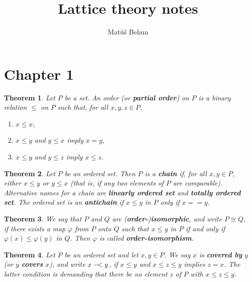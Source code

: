 \documentclass[a4paper,12pt,oneside]{report}%
\author{Mat\'u\v{s} Behun}
\title{Lattice theory notes}
\newcommand{\coveringA}{%
  \mathrel{-\mkern-4mu}<%
}
\newtheorem{theorem}{Theorem}
\begin{document}
\section{Chapter 1}

\begin{theorem}
Let $P$ be a set. An order (or \textbf{partial order}) on $P$ is a binary
    relation $\leq$ on $P$ such that, for all $x, y, z \in P$,
\begin{enumerate}
    \item $x \leq x$,
    \item $x \leq y$ and $y \leq x$ imply $x = y$,
    \item $x \leq y$ and $y \leq z$ imply $x \leq z$.
\end{enumerate}
\end{theorem}

\begin{theorem}
Let $P$ be an ordered set. Then $P$ is a \textbf{chain} if, for all
    $x, y \in P$, either $x \leq y$ or $y \leq x$ (that is, if any two elements
    of $P$ are comparable).
    Alternative names for a chain are \textbf{linearly ordered set} and
    \textbf{totally ordered set}.
The ordered set is an \textbf{antichain} if $x \leq y$ in $P$ only if $x ==y$.
\end{theorem}

\begin{theorem}
We say that $P$ and $Q$ are (\textbf{order-})\textbf{isomorphic}, and write
    $P \cong Q$, if there exists a map $\varphi$ from $P$ onto $Q$ such that
    $x \leq y$ in $P$ if and only if $\varphi(x) \leq \varphi(y)$ in $Q$. 
Then $\varphi$ is called \textbf{order-isomorphism}.
\end{theorem}

\begin{theorem}
Let $P$ be an ordered set and let $x,y \in P$. We say $x$ is \textbf{covered by}
    $y$ (or $y$ \textbf{covers} $x$), and write $x \coveringA y$, if $x \le y$
    and $x \leq z \le y$ implies $z = x$.
The latter condition is demanding that there be no element $z$ of $P$ with
    $x \le z \le y$.
\end{theorem}
\end{document}
